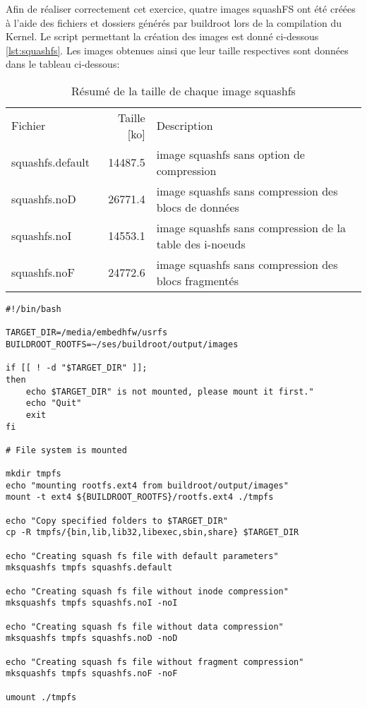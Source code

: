 Afin de réaliser correctement cet exercice, quatre images squashFS ont été créées à l'aide des fichiers et dossiers générés par buildroot lors de la compilation du Kernel. Le script permettant la création des images est donné ci-dessous \ref{lst:squashfs}. Les images obtenues ainsi que leur taille respectives sont données dans le tableau ci-dessous:
\begin{table}[H]
	\centering
	\begin{tabular}{lrp{10cm}}
	Fichier & Taille [ko] & Description\\
	squashfs.default & 14487.5 & image squashfs sans option de compression\\
	squashfs.noD & 26771.4 & image squashfs sans compression des blocs de données\\
	squashfs.noI & 14553.1 & image squashfs sans compression de la table des i-noeuds\\
	squashfs.noF & 24772.6 & image squashfs sans compression des blocs fragmentés
	\end{tabular}
	\caption{\label{table:squashfs size}Résumé de la taille de chaque image squashfs}
\end{table}

\begin{lstlisting}[caption=Création des images squash fs,label=lst:squashfs]
#!/bin/bash

TARGET_DIR=/media/embedhfw/usrfs
BUILDROOT_ROOTFS=~/ses/buildroot/output/images

if [[ ! -d "$TARGET_DIR" ]];
then
	echo $TARGET_DIR" is not mounted, please mount it first."
	echo "Quit"
	exit
fi

# File system is mounted

mkdir tmpfs
echo "mounting rootfs.ext4 from buildroot/output/images"
mount -t ext4 ${BUILDROOT_ROOTFS}/rootfs.ext4 ./tmpfs

echo "Copy specified folders to $TARGET_DIR"
cp -R tmpfs/{bin,lib,lib32,libexec,sbin,share} $TARGET_DIR

echo "Creating squash fs file with default parameters"
mksquashfs tmpfs squashfs.default

echo "Creating squash fs file without inode compression"
mksquashfs tmpfs squashfs.noI -noI

echo "Creating squash fs file without data compression"
mksquashfs tmpfs squashfs.noD -noD

echo "Creating squash fs file without fragment compression"
mksquashfs tmpfs squashfs.noF -noF

umount ./tmpfs
\end{lstlisting}

